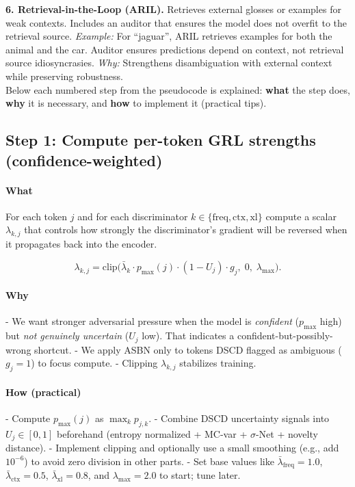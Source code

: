 \documentclass[11pt]{article}
\begin{document}
\textbf{6. Retrieval-in-the-Loop (ARIL).}  
Retrieves external glosses or examples for weak contexts. Includes an auditor that ensures the model does not overfit to the retrieval source.  
\emph{Example:} For ``jaguar'', ARIL retrieves examples for both the animal and the car. Auditor ensures predictions depend on context, not retrieval source idiosyncrasies.  
\emph{Why:} Strengthens disambiguation with external context while preserving robustness.\\


Below each numbered step from the pseudocode is explained: \textbf{what} the step does, \textbf{why} it is necessary, and \textbf{how} to implement it (practical tips).

\subsection*{Step 1: Compute per-token GRL strengths (confidence-weighted)}
\paragraph{What}
For each token $j$ and for each discriminator $k\in\{\mathrm{freq},\mathrm{ctx},\mathrm{xl}\}$ compute a scalar $\lambda_{k,j}$ that controls how strongly the discriminator's gradient will be reversed when it propagates back into the encoder.

\[
\lambda_{k,j} = \mathrm{clip}\big(\bar{\lambda}_k \cdot p_{\max}(j)\cdot (1-U_j)\cdot g_j ,\; 0,\; \lambda_{\max}\big).
\]

\paragraph{Why}
- We want stronger adversarial pressure when the model is \emph{confident} ($p_{\max}$ high) but \emph{not genuinely uncertain} ($U_j$ low). That indicates a confident-but-possibly-wrong shortcut.  
- We apply ASBN only to tokens DSCD flagged as ambiguous ($g_j=1$) to focus compute.  
- Clipping $\lambda_{k,j}$ stabilizes training.

\paragraph{How (practical)}
- Compute $p_{\max}(j)$ as $\max_k p_{j,k}$.  
- Combine DSCD uncertainty signals into $U_j\in[0,1]$ beforehand (entropy normalized + MC-var + $\sigma$-Net + novelty distance).  
- Implement clipping and optionally use a small smoothing (e.g., add $10^{-6}$) to avoid zero division in other parts.  
- Set base values like $\bar{\lambda}_{\text{freq}}=1.0$, $\bar{\lambda}_{\text{ctx}}=0.5$, $\bar{\lambda}_{\text{xl}}=0.8$, and $\lambda_{\max}=2.0$ to start; tune later.
\end{document}
